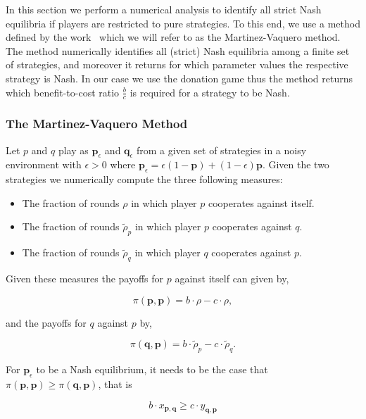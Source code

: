 \documentclass{article}
\theoremstyle{definition}
\begin{document}
In this section we perform a numerical analysis to identify all strict Nash
equilibria if players are restricted to pure strategies. To this end, we use a
method defined by the work~\citep{hilbe:PNAS:2017} which we will refer to as the
Martinez-Vaquero method. The method numerically identifies all (strict) Nash equilibria
among a finite set of strategies, and moreover it returns for which parameter
values the respective strategy is Nash. In our case we use the donation game
thus the method returns which benefit-to-cost ratio \(\frac{b}{c}\) is required
for a strategy to be Nash.

\subsubsection{The Martinez-Vaquero Method}

Let \(p\) and \(q\) play as \(\mathbf{p}_{\epsilon}\) and
\(\mathbf{q}_{\epsilon}\) from a given set of strategies in a noisy environment
with \(\epsilon > 0\) where \(\mathbf{p}_{\epsilon} = \epsilon(1 - \mathbf{p}) +
(1 - \epsilon)\mathbf{p} \). Given the two strategies we numerically compute
the three following measures:


\begin{itemize}
  \item The fraction of rounds \(\rho\) in which player \(p\) cooperates against itself.
  \item The fraction of rounds \(\tilde{\rho}_p\) in which player \(p\) cooperates against \(q\).
  \item The fraction of rounds \(\tilde{\rho}_q\) in which player \(q\) cooperates against \(p\).
\end{itemize}

Given these measures the payoffs for \(p\) against itself can given by,

\[\pi (\mathbf{p}, \mathbf{p}) = b \cdot \rho - c\cdot\rho,\]

and the payoffs for \(q\) against \(p\) by,

\[\pi(\mathbf{q}, \mathbf{p}) = b \cdot \tilde{\rho}_p - c\cdot\tilde{\rho}_q.\]

For \(\mathbf{p}_{\epsilon}\) to be a Nash equilibrium, it needs to be the case that \(\pi (\mathbf{p}, \mathbf{p}) \geq
\pi(\mathbf{q}, \mathbf{p})\), that is

\begin{equation}\label{eq:nash_vaquero}
  b \cdot x_{\mathbf{p}, \mathbf{q}} \geq c \cdot y_{\mathbf{q}, \mathbf{p}}
\end{equation}
\end{document}
